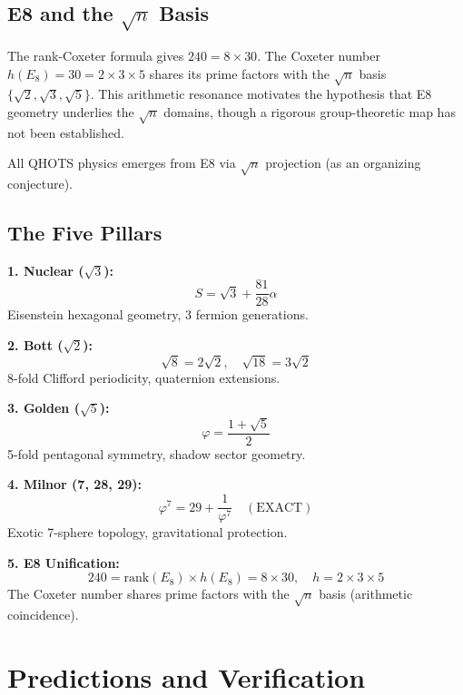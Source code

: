 \documentclass[aps,prd,twocolumn,superscriptaddress,floatfix,nofootinbib]{revtex4-2}
\theoremstyle{definition}
\theoremstyle{remark}
\newcommand{\vp}{\varphi}
\begin{document}
\subsection{E8 and the $\sqrt{n}$ Basis}

The rank-Coxeter formula gives $240 = 8 \times 30$. The Coxeter number $h(E_8) = 30 = 2 \times 3 \times 5$
shares its prime factors with the $\sqrt{n}$ basis $\{\sqrt{2}, \sqrt{3}, \sqrt{5}\}$.
This arithmetic resonance motivates the hypothesis that E8 geometry underlies the $\sqrt{n}$
domains, though a rigorous group-theoretic map has not been established.

All QHOTS physics emerges from E8 via $\sqrt{n}$ projection (as an organizing conjecture).

\subsection{The Five Pillars}

\textbf{1. Nuclear ($\sqrt{3}$):}
\begin{equation}
S = \sqrt{3} + \frac{81}{28}\alpha
\end{equation}
Eisenstein hexagonal geometry, 3 fermion generations.

\textbf{2. Bott ($\sqrt{2}$):}
\begin{equation}
\sqrt{8} = 2\sqrt{2}, \quad \sqrt{18} = 3\sqrt{2}
\end{equation}
8-fold Clifford periodicity, quaternion extensions.

\textbf{3. Golden ($\sqrt{5}$):}
\begin{equation}
\vp = \frac{1 + \sqrt{5}}{2}
\end{equation}
5-fold pentagonal symmetry, shadow sector geometry.

\textbf{4. Milnor (7, 28, 29):}
\begin{equation}
\vp^7 = 29 + \frac{1}{\vp^7} \quad (\text{EXACT})
\end{equation}
Exotic 7-sphere topology, gravitational protection.

\textbf{5. E8 Unification:}
\begin{equation}
240 = \mathrm{rank}(E_8) \times h(E_8) = 8 \times 30, \quad h = 2 \times 3 \times 5
\end{equation}
The Coxeter number shares prime factors with the $\sqrt{n}$ basis (arithmetic coincidence).

\section{Predictions and Verification}
\end{document}
